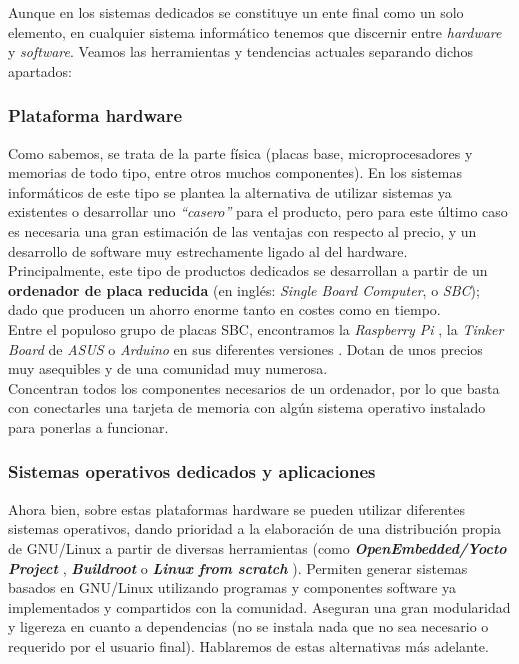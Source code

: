 Aunque en los sistemas dedicados se constituye un ente final como un solo elemento, en cualquier sistema informático tenemos que discernir entre \textit{hardware} y \textit{software}. Veamos las herramientas y tendencias actuales separando dichos apartados:

\subsubsection{Plataforma hardware}

Como sabemos, se trata de la parte física (placas base, microprocesadores y memorias de todo tipo, entre otros muchos componentes). En los sistemas informáticos de este tipo se plantea la alternativa de utilizar sistemas ya existentes o desarrollar uno \textit{``casero''} para el producto, pero para este último caso es necesaria una gran estimación de las ventajas con respecto al precio, y un desarrollo de software muy estrechamente ligado al del hardware.\\

Principalmente, este tipo de productos dedicados se desarrollan a partir de un \textbf{ordenador de placa reducida} (en inglés: \textit{Single Board Computer}, o \textit{SBC}); dado que producen un ahorro enorme tanto en costes como en tiempo.\\

Entre el populoso grupo de placas SBC, encontramos la \textit{Raspberry Pi} \cite{raspberry-pi}, la \textit{Tinker Board} de \textit{ASUS} \cite{asus-tinkerboard} o \textit{Arduino} en sus diferentes versiones \cite{arduino-store}. Dotan de unos precios muy asequibles y de una comunidad muy numerosa.\\

Concentran todos los componentes necesarios de un ordenador, por lo que basta con conectarles una tarjeta de memoria con algún sistema operativo instalado para ponerlas a funcionar.\\

\subsubsection{Sistemas operativos dedicados y aplicaciones}

Ahora bien, sobre estas plataformas hardware se pueden utilizar diferentes sistemas operativos, dando prioridad a la elaboración de una distribución propia de GNU/Linux a partir de diversas herramientas (como \textit{\textbf{OpenEmbedded/Yocto Project}} \cite{yocto-project}, \textit{\textbf{Buildroot}} \cite{buildroot} o \textit{\textbf{Linux from scratch}} \cite{linux-from-scratch}). Permiten generar sistemas basados en GNU/Linux utilizando programas y componentes software ya implementados y compartidos con la comunidad. Aseguran una gran modularidad y ligereza en cuanto a dependencias (no se instala nada que no sea necesario o requerido por el usuario final). Hablaremos de estas alternativas más adelante.\\

